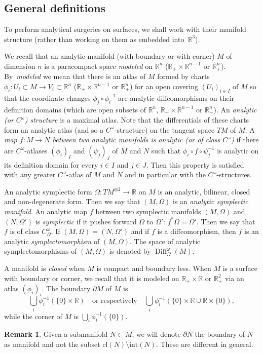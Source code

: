 \documentclass[JEP,XML,SOM,Unicode,NoFloatCountersInSection,Unicode,published]{cedram}
\newcommand{\cl}{\mathrm{cl}}
\newcommand{\Int}{\mathrm{int}}
\newcommand\R{\mathbb R}
\DeclareMathOperator\Diff{Diff}
\theoremstyle{definition}
\newtheorem{remark}[proposition]{Remark}
\begin{document}
\subsection{General definitions}\label{S21}
To perform analytical surgeries on surfaces, we shall work with their manifold structure (rather than working on them as embedded into~$\R^3$).

We recall that an analytic manifold (\resp with boundary or with corner) $M$ of dimension $n$ is a paracompact space \emph{modeled} on $\R^n$ (\resp $\R_+\times \R^{n-1}$ or $\R_+^n$). By~\emph{modeled} we mean that there is an atlas of $M$ formed by charts $\phi_i: U_i\subset M\to V_i\subset \R^n$ (\resp $\R_+\times \R^{n-1}$ or $\R_+^n$) for an open covering $(U_i)_{i\in I}$ of $M$ so that the coordinate changes $\phi_j\circ \phi^{-1}_i$ are analytic diffeomorphisms on their definition domains (which are open subsets of \resp $\R^n$, $\R_+\times \R^{n-1}$ or $\R_+^n$). An \emph{analytic (or $C^\omega$) structure} is a maximal atlas. Note that the differentials of these charts form an analytic atlas (and so a $C^\omega$-structure) on the tangent space $TM$ of $M$. A \emph{map $f: M\to N$ between two analytic manifolds is analytic (or of class $C^\omega$)} if there are $C^\omega$-atlases $(\phi_i)_{I}$ and $(\psi_j)_{J}$ of $M$ and $N$ such that $\phi_i\circ f\circ \psi^{-1}_j$ is analytic on its definition domain for every $i\in I$ and $j\in J$. Then this property is satisfied with any greater $C^\omega$-atlas of $M$ and $N$ and in particular with the $C^\omega$-structures.

An analytic symplectic form $\Omega:TM^{\otimes 2}\to \R$ on $M$ is an analytic, bilinear, closed and non-degenerate form. Then we say that $(M,\Omega)$ is an \emph{analytic symplectic manifold}.
An analytic map $f$ between two symplectic manifolds $(M,\Omega)$ and $(N,\Omega')$ is \emph{symplectic} if it pushes forward $\Omega$ to $\Omega'$: $f^*\Omega = \Omega'$. Then we say that $f$ is of class $C^\omega_\Omega$. If $(M,\Omega)=(N, \Omega')$ and if $f$ is a diffeomorphism, then $f$ is an analytic \emph{symplectomorphism} of $(M,\Omega)$. The space of analytic symplectomorphisms of $(M,\Omega)$ is denoted by $\Diff^\omega_\Omega(M)$.

A manifold is \emph{closed} when $M$ is compact and boundary less.
When $M$ is a surface with boundary or corner, we recall that it is modeled on $\R_+\times \R$ or $\R_+^2$ via an atlas $(\phi_i)_i$.
The boundary $\partial M$ of $M$ is
\[
\bigcup_i \phi^{-1}_i(\{0\}\times \R)\quad\text{or respectively}\quad \bigcup_i \phi^{-1}_i(\{0\}\times \R\cup \R\times \{0\}),
\]
while the corner of $M$ is $\bigcup_i \phi^{-1}_i(\{0\})$.
\begin{remark}
Given a submanifold $N \subset M$, we will denote $\partial N$ the boundary of $N$ as manifold and not the subset $\cl(N) \setminus \Int(N)$. These are different in general.
\end{remark}
\end{document}
